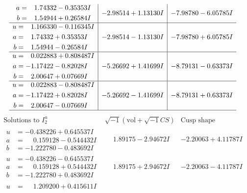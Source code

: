 \documentclass[1p]{elsarticle_modified}
\theoremstyle{definition}
\newcommand{\I}{\sqrt{-1}}
\begin{document}
$$\begin{array}{c|c|c}
\begin{aligned}
a &= \phantom{-}1.74332 - 0.35353 I \\
b &= \phantom{-}1.54944 + 0.26584 I\end{aligned}
 & -2.98514 + 1.13130 I & -7.98780 - 6.05785 I \\ \hline\begin{aligned}
u &= \phantom{-}1.166330 - 0.116345 I \\
a &= \phantom{-}1.74332 + 0.35353 I \\
b &= \phantom{-}1.54944 - 0.26584 I\end{aligned}
 & -2.98514 - 1.13130 I & -7.98780 + 6.05785 I \\ \hline\begin{aligned}
u &= \phantom{-}0.022883 + 0.808487 I \\
a &= -1.17422 - 0.82028 I \\
b &= \phantom{-}2.00647 + 0.07669 I\end{aligned}
 & -5.26692 + 1.41699 I & -8.79131 - 0.63373 I \\ \hline\begin{aligned}
u &= \phantom{-}0.022883 - 0.808487 I \\
a &= -1.17422 + 0.82028 I \\
b &= \phantom{-}2.00647 - 0.07669 I\end{aligned}
 & -5.26692 - 1.41699 I & -8.79131 + 0.63373 I\\
 \hline 
 \end{array}$$\newpage$$\begin{array}{c|c|c}  
\text{Solutions to }I^u_{2}& \I (\text{vol} + \sqrt{-1}CS) & \text{Cusp shape}\\
 \hline 
\begin{aligned}
u &= -0.438226 + 0.645537 I \\
a &= \phantom{-}0.159128 - 0.544432 I \\
b &= -1.222780 - 0.483692 I\end{aligned}
 & \phantom{-}1.89175 - 2.94672 I & -2.20063 + 4.11787 I \\ \hline\begin{aligned}
u &= -0.438226 - 0.645537 I \\
a &= \phantom{-}0.159128 + 0.544432 I \\
b &= -1.222780 + 0.483692 I\end{aligned}
 & \phantom{-}1.89175 + 2.94672 I & -2.20063 - 4.11787 I \\ \hline\begin{aligned}
u &= \phantom{-}1.209200 + 0.415611 I \\

\end{aligned}
\end{array}$$
\end{document}
